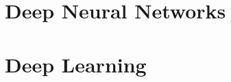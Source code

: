 \section{Deep Neural Networks}        
  


\Blindtext[4][1]

\section{Deep Learning}
\Blindtext[4][1]
